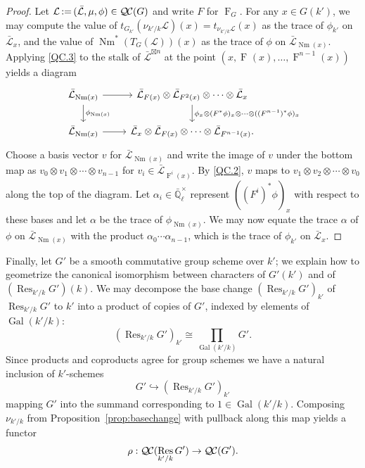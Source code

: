 \documentclass{amsart}
\theoremstyle{plain}
\theoremstyle{definition}
\theoremstyle{remark}
\newcommand{\EE}{\mathbb{\bar Q}_\ell}
\newcommand{\EEx}{\EE^\times}
\DeclareMathOperator{\Gal}{Gal}
\newcommand{\Frob}[1]{\operatorname{F}_{#1}}
\DeclareMathOperator{\Res}{Res}
\DeclareMathOperator{\Nm}{Nm}
\newcommand{\ceq}{{\, :=\, }}
\newcommand{\qcs}[1]{{\mathcal{#1}}}
\newcommand{\gqcs}[1]{{\mathcal{\bar #1}}}
\newcommand{\QC}{{\mathcal{Q\hskip-0.8pt C}}}
\newcommand{\TrFrob}[1]{T_{#1}}
\begin{document}
\begin{proof}
Let $\qcs{L} \ceq (\gqcs{L}, \mu, \phi) \in \QC(G)$ and write $F$ for $\Frob{G}$.  For any $x \in G(k')$,
we may compute the value of $t_{G_{k'}}(\nu_{k'/k}\qcs{L})(x)= t_{\nu_{k'/k}\qcs{L}}(x)$ as the trace of $\phi_{k'}$ on $\gqcs{L}_x$,
and the value of $\Nm^*(\TrFrob{G}(\qcs{L}))(x)$ as the trace of $\phi$ on $\gqcs{L}_{\Nm(x)}$.
Applying \ref{QC.3} to the stalk of $\gqcs{L}^{\boxtimes n}$ at the point $(x, \Frob{}(x), \ldots, \Frob{}^{n-1}(x))$ yields a diagram
\[
\begin{tikzcd}
\gqcs{L}_{\Nm(x)} \rar \dar{\phi_{\Nm(x)}} & \gqcs{L}_{F(x)} \otimes \gqcs{L}_{F^2(x)} \otimes \cdots \otimes \gqcs{L}_x
\dar{\phi_x \otimes (F^*\phi)_x \otimes \cdots \otimes ((F^{n-1})^*\phi)_x} \\
\gqcs{L}_{\Nm(x)} \rar & \gqcs{L}_x \otimes \gqcs{L}_{F(x)} \otimes \cdots \otimes \gqcs{L}_{F^{n-1}(x)}.
\end{tikzcd}
\]
Choose a basis vector $v$ for $\gqcs{L}_{\Nm(x)}$ and write the image of $v$ under the
bottom map as $v_0 \otimes v_1 \otimes \cdots \otimes v_{n-1}$
for $v_i \in \gqcs{L}_{\Frob{}^i(x)}$.  By \ref{QC.2}, $v$ maps to
$v_1 \otimes v_2 \otimes \cdots \otimes v_0$ along the top of the diagram.
Let $\alpha_i \in \EEx$ represent $((F^i)^*\phi)_x$ with respect to these bases and let $\alpha$ be
the trace of $\phi_{\Nm(x)}$.  We may now equate the trace $\alpha$ of $\phi$ on $\gqcs{L}_{\Nm(x)}$
with the product $\alpha_0 \cdots \alpha_{n-1}$, which is the trace of $\phi_{k'}$ on $\gqcs{L}_x$.
\end{proof}

Finally, let $G'$ be a smooth commutative group scheme over $k'$;
we explain how to geometrize the canonical isomorphism between characters of $G'(k')$ and of $(\Res_{k'/k}G')(k)$.
We may decompose the base change $(\Res_{k'/k}G')_{k'}$ of $\Res_{k'/k}G'$ to $k'$
into a product of copies of $G'$, indexed by elements of $\Gal(k'/k)$:
\[
(\Res_{k'/k}G')_{k'} \cong \prod_{\Gal(k'/k)} G'.
\]
Since products and coproducts agree for group schemes we have a natural inclusion of $k'$-schemes
\[
G' \hookrightarrow (\Res_{k'/k}G')_{k'}
\]
mapping $G'$ into the summand corresponding to $1 \in \Gal(k'/k)$.  Composing $\nu_{k'/k}$
from Proposition~\ref{prop:basechange} with pullback along this map yields a functor
\[
\rho : \QC(\Res_{k'/k}G') \to \QC(G').
\]
\end{document}
